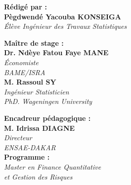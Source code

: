 \documentclass[a4paper]{article}
\begin{document}
\begin{center}
    {\color{senegalblue} \textbf{Rédigé par :}}\\
    {\large \textbf{Pègdwendé Yacouba KONSEIGA}}\\
    {\textit{Élève Ingénieur des Travaux Statistiques}}\\[0.8cm]
    
    \begin{minipage}{0.45\textwidth}
        \centering
        {\color{senegalblue} \textbf{Maître de stage :}}\\
        {\textbf{Dr. Ndèye Fatou Faye MANE}}\\
        {\textit{Économiste}}\\
        {\textit{BAME/ISRA}}\\[0.3cm]
        {\textbf{M. Rassoul SY}}\\
        {\textit{Ingénieur Statisticien}}\\
        {\textit{PhD. Wageningen University}}
    \end{minipage}
    \hfill
    \begin{minipage}{0.45\textwidth}
        \centering
        {\color{senegalblue} \textbf{Encadreur pédagogique :}}\\
        {\textbf{M. Idrissa DIAGNE}}\\
        {\textit{Directeur}}\\
        {\textit{ENSAE-DAKAR}}\\[0.5cm]
        
        {\color{senegalblue} \textbf{Programme :}}\\
        {\textit{Master en Finance Quantitative}}\\
        {\textit{et Gestion des Risques}}
    \end{minipage}
\end{center}

\vspace{1cm}

\begin{center}
\end{center}
\end{document}
